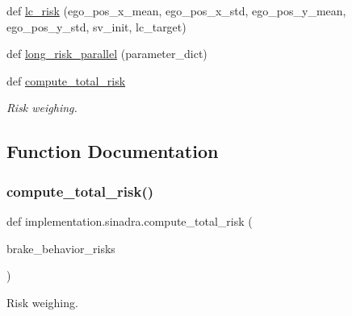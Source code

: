 \begin{DoxyCompactItemize}
\item 
def \hyperlink{namespaceimplementation_1_1sinadra_a6e6ff8c6fd9f63ad37f882293bfefc3b}{lc\+\_\+risk} (ego\+\_\+pos\+\_\+x\+\_\+mean, ego\+\_\+pos\+\_\+x\+\_\+std, ego\+\_\+pos\+\_\+y\+\_\+mean, ego\+\_\+pos\+\_\+y\+\_\+std, sv\+\_\+init, lc\+\_\+target)
\item 
def \hyperlink{namespaceimplementation_1_1sinadra_a5a538278e7e675820ace17163d77699e}{long\+\_\+risk\+\_\+parallel} (parameter\+\_\+dict)
\item 
def \hyperlink{namespaceimplementation_1_1sinadra_a44158ab1ac67876e44ce2fa987d2c83a}{compute\+\_\+total\+\_\+risk}
\begin{DoxyCompactList}\small\item\em Risk weighing. \end{DoxyCompactList}\end{DoxyCompactItemize}


\subsection{Function Documentation}
\mbox{\label{namespaceimplementation_1_1sinadra_a44158ab1ac67876e44ce2fa987d2c83a}} 
\subsubsection{\texorpdfstring{compute\+\_\+total\+\_\+risk()}{compute\_total\_risk()}}
{\footnotesize\ttfamily def implementation.\+sinadra.\+compute\+\_\+total\+\_\+risk (\begin{DoxyParamCaption}\item[{}]{brake\+\_\+behavior\+\_\+risks }\end{DoxyParamCaption})}



Risk weighing. 

\mbox{\label{namespaceimplementation_1_1sinadra_ad13d5653e8d4562e522ead829bd36b39}} 
